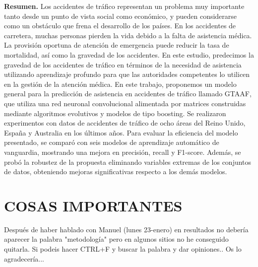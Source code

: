 \documentclass{uathesis-es}
\begin{document}
{\textbf{Resumen.} Los accidentes de tráfico representan un problema muy importante tanto desde un punto de vista social como económico, y pueden considerarse como un obstáculo que frena el desarrollo de los países. En los accidentes de carretera, muchas personas pierden la vida debido a la falta de asistencia médica. La provisión oportuna de atención de emergencia puede reducir la tasa de mortalidad, así como la gravedad de los accidentes. En este estudio, predecimos la gravedad de los accidentes de tráfico en términos de la necesidad de asistencia utilizando aprendizaje profundo para que las autoridades competentes lo utilicen en la gestión de la atención médica. En este trabajo, proponemos un modelo general para la predicción de asistencia en accidentes de tráfico llamado GTAAF, que utiliza una red neuronal convolucional alimentada por matrices construidas mediante algoritmos evolutivos y modelos de tipo boosting. Se realizaron experimentos con datos de accidentes de tráfico de ocho áreas del Reino Unido, España y Australia en los últimos años. Para evaluar la eficiencia del modelo presentado, se comparó con seis modelos de aprendizaje automático de vanguardia, mostrando una mejora en precisión, recall y F1-score. Además, se probó la robustez de la propuesta eliminando variables extremas de los conjuntos de datos, obteniendo mejoras significativas respecto a los demás modelos.


\chapter{COSAS IMPORTANTES}

Después de haber hablado con Manuel (lunes 23-enero) en resultados no debería aparecer la palabra "metodología" pero en algunos sitios no he conseguido quitarla. Si podeis hacer CTRL+F y buscar la palabra y dar opiniones.. Os lo agradecería...


}
\end{document}
